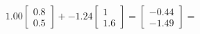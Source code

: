 \documentclass[preview]{standalone}
\begin{document}
\begin{align*}
1.00 \begin{bmatrix} 0.8 \\ 0.5 \end{bmatrix} + -1.24 \begin{bmatrix} 1 \\ 1.6 \end{bmatrix} = \begin{bmatrix} -0.44 \\ -1.49 \end{bmatrix} =
\end{align*}
\end{document}
